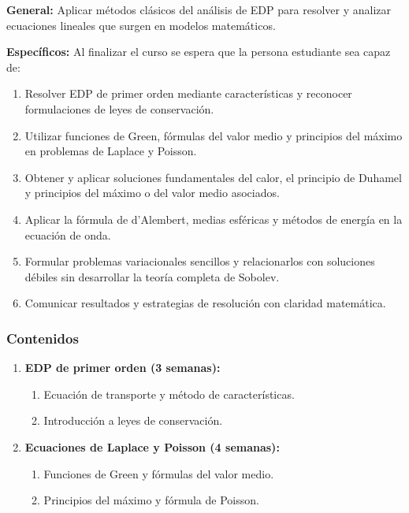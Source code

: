 \begin{refsection}
\textbf{General:} Aplicar métodos clásicos del análisis de EDP para resolver y analizar ecuaciones lineales que surgen en modelos matemáticos.

\textbf{Específicos:} Al finalizar el curso se espera que la persona estudiante sea capaz de:

\begin{enumerate}
\item Resolver EDP de primer orden mediante características y reconocer formulaciones de leyes de conservación.
\item Utilizar funciones de Green, fórmulas del valor medio y principios del máximo en problemas de Laplace y Poisson.
\item Obtener y aplicar soluciones fundamentales del calor, el principio de Duhamel y principios del máximo o del valor medio asociados.
\item Aplicar la fórmula de d'Alembert, medias esféricas y métodos de energía en la ecuación de onda.
\item Formular problemas variacionales sencillos y relacionarlos con soluciones débiles sin desarrollar la teoría completa de Sobolev.
\item Comunicar resultados y estrategias de resolución con claridad matemática.
\end{enumerate}

\subsubsection*{Contenidos}

\begin{enumerate}

\item \textbf{EDP de primer orden (3 semanas):}
\begin{enumerate}
    \item Ecuación de transporte y método de características.
    \item Introducción a leyes de conservación.
\end{enumerate}

\item \textbf{Ecuaciones de Laplace y Poisson (4 semanas):}
\begin{enumerate}
    \item Funciones de Green y fórmulas del valor medio.
    \item Principios del máximo y fórmula de Poisson.
\end{enumerate}


\end{enumerate}
\end{refsection}
